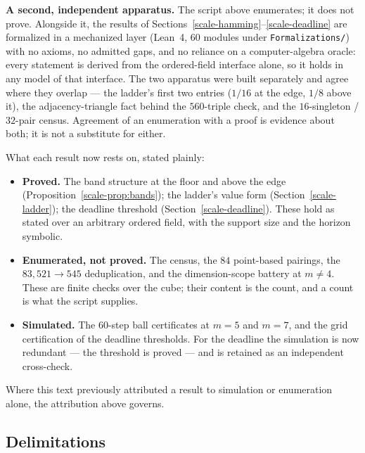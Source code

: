 \documentclass[10pt,twocolumn]{article}
\theoremstyle{plain}
\theoremstyle{definition}
\theoremstyle{remark}
\begin{document}
\textbf{A second, independent apparatus.} The script above enumerates;
it does not prove. Alongside it, the results of
Sections~\ref{scale-hamming}--\ref{scale-deadline} are formalized in a mechanized
layer (Lean~4, 60 modules under \texttt{Formalizations/}) with no axioms, no admitted
gaps, and no reliance on a computer-algebra oracle: every statement is
derived from the ordered-field interface alone, so it holds in any
model of that interface. The two apparatus were built separately and
agree where they overlap --- the ladder's first two entries
(\(1/16\) at the edge, \(1/8\) above it), the
adjacency-triangle fact behind the \(560\)-triple check, and the
\(16\)-singleton / \(32\)-pair census. Agreement of an enumeration
with a proof is evidence about both; it is not a substitute for either.

What each result now rests on, stated plainly:

\begin{itemize}
\item \textbf{Proved.} The band structure at the floor and above the
edge (Proposition~\ref{scale-prop:bands}); the ladder's value form
(Section~\ref{scale-ladder}); the deadline threshold
(Section~\ref{scale-deadline}). These hold as stated over an arbitrary
ordered field, with the support size and the horizon symbolic.

\item \textbf{Enumerated, not proved.} The census, the \(84\)
point-based pairings, the \(83{,}521 \to 545\) deduplication, and the
dimension-scope battery at \(m \ne 4\). These are finite checks over
the cube; their content is the count, and a count is what the script
supplies.

\item \textbf{Simulated.} The \(60\)-step ball certificates at
\(m = 5\) and \(m = 7\), and the grid certification of the deadline
thresholds. For the deadline the simulation is now redundant --- the
threshold is proved --- and is retained as an independent cross-check.
\end{itemize}

\noindent Where this text previously attributed a result to simulation
or enumeration alone, the attribution above governs.

\subsection{Delimitations}\label{scale-scope}
\end{document}
